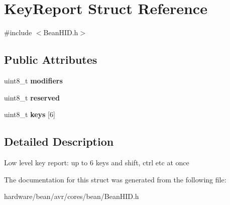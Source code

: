\hypertarget{struct_key_report}{}\section{Key\+Report Struct Reference}
\label{struct_key_report}


{\ttfamily \#include $<$Bean\+H\+I\+D.\+h$>$}

\subsection*{Public Attributes}
\begin{DoxyCompactItemize}
\item 
\hypertarget{struct_key_report_a2ead73d1505b8909d72f07d9b1c2874d}{}uint8\+\_\+t {\bfseries modifiers}\label{struct_key_report_a2ead73d1505b8909d72f07d9b1c2874d}

\item 
\hypertarget{struct_key_report_a47ab672d90ca943f19d552a07a5f2afa}{}uint8\+\_\+t {\bfseries reserved}\label{struct_key_report_a47ab672d90ca943f19d552a07a5f2afa}

\item 
\hypertarget{struct_key_report_a73742ff22b1a767b260633c99baaa374}{}uint8\+\_\+t {\bfseries keys} \mbox{[}6\mbox{]}\label{struct_key_report_a73742ff22b1a767b260633c99baaa374}

\end{DoxyCompactItemize}


\subsection{Detailed Description}
Low level key report\+: up to 6 keys and shift, ctrl etc at once 

The documentation for this struct was generated from the following file\+:\begin{DoxyCompactItemize}
\item 
hardware/bean/avr/cores/bean/Bean\+H\+I\+D.\+h\end{DoxyCompactItemize}
